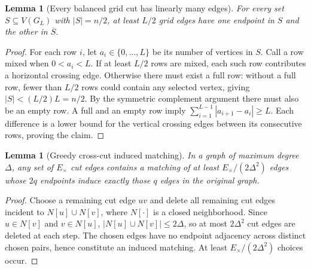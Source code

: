 \documentclass[11pt]{article}
\newtheorem{lemma}[theorem]{Lemma}
\begin{document}
\begin{lemma}[Every balanced grid cut has linearly many edges]\label{lem:cut}
For every set $S\subseteq V(G_L)$ with $|S|=n/2$, at least $L/2$ grid edges have one endpoint in $S$ and the other in $\overline S$.
\end{lemma}
\begin{proof}
For each row $i$, let $a_i\in\{0,\ldots,L\}$ be its number of vertices in $S$. Call a row mixed when $0<a_i<L$. If at least $L/2$ rows are mixed, each such row contributes a horizontal crossing edge. Otherwise there must exist a full row: without a full row, fewer than $L/2$ rows could contain any selected vertex, giving $|S|<(L/2)L=n/2$. By the symmetric complement argument there must also be an empty row. A full and an empty row imply
$\sum_{i=1}^{L-1}|a_{i+1}-a_i|\ge L$.
Each difference is a lower bound for the vertical crossing edges between its consecutive rows, proving the claim.
\end{proof}

\begin{lemma}[Greedy cross-cut induced matching]\label{lem:matching}
In a graph of maximum degree $\Delta$, any set of $E_\times$ cut edges contains a matching of at least $E_\times/(2\Delta^2)$ edges whose $2q$ endpoints induce exactly those $q$ edges in the original graph.
\end{lemma}
\begin{proof}
Choose a remaining cut edge $uv$ and delete all remaining cut edges incident to $N[u]\cup N[v]$, where $N[\cdot]$ is a closed neighborhood. Since $u\in N[v]$ and $v\in N[u]$, $|N[u]\cup N[v]|\le2\Delta$, so at most $2\Delta^2$ cut edges are deleted at each step. The chosen edges have no endpoint adjacency across distinct chosen pairs, hence constitute an induced matching. At least $E_\times/(2\Delta^2)$ choices occur.
\end{proof}
\end{document}
